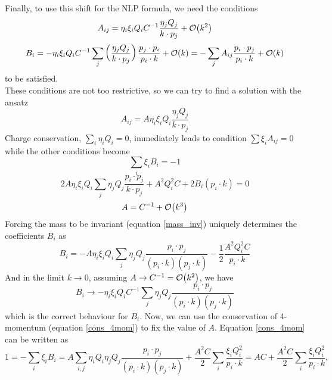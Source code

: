 \documentclass{article}
\begin{document}
Finally, to use this shift for the NLP formula, we need the conditions
\begin{equation*}
A_{ij} = \eta_i\xi_iQ_iC^{-1}\frac{\eta_j Q_j}{k\cdot p_j} + \order{k^2}
\end{equation*}
\begin{equation*}
B_i = -\eta_i\xi_iQ_iC^{-1} \sum_{j} \left(\frac{\eta_j Q_j}{k\cdot p_j}\right)\frac{p_j\cdot p_i }{p_i\cdot k} + \order{k} = - \sum_j A_{ij}\frac{p_i\cdot p_j}{p_i\cdot k} + \order{k}
\end{equation*}
to be satisfied.
\
\\
These conditions are not too restrictive, so we can try to find a solution with the ansatz
\begin{equation*}
A_{ij} = A\eta_i\xi_iQ_i\frac{\eta_j Q_j}{k\cdot p_j}
\end{equation*}
Charge conservation, $\sum_i \eta_i Q_i = 0$, immediately leads to condition $\sum \xi_i A_{ij}=0$ while the other conditions become
\begin{equation}\label{cons_4mom}
\sum_i \xi_i B_i = -1
\end{equation}
\begin{equation}\label{mass_inv}
2A\eta_i\xi_iQ_i\sum_{j}\eta_j Q_j\frac{p_{i}\cdot p_{j}}{k\cdot p_j}+A^2Q^2_iC
+2B_{i}(p_{i}\cdot k)= 0
\end{equation}
\begin{equation*}
A = C^{-1} + \order{k^3}
\end{equation*}
Forcing the mass to be invariant (equation \eqref{mass_inv}) uniquely determines the coefficients $B_i$ as
\begin{equation*}
B_{i}= -A\eta_i\xi_iQ_i\sum_{j}\eta_j Q_j\frac{p_{i}\cdot p_{j}}{(p_{i}\cdot k)(p_j\cdot k)}-\frac{1}{2}\frac{A^2Q^2_iC}{p_i\cdot k}
\end{equation*}
And in the limit $k\to 0$, assuming $A \to C^{-1}=\order{k^2}$, we have
\begin{equation*}
B_{i} \to -\eta_i\xi_iQ_iC^{-1}\sum_{j}\eta_j Q_j\frac{p_{i}\cdot p_{j}}{(p_{i}\cdot k)(p_j\cdot k)}
\end{equation*}
which is the correct behaviour for $B_i$.
Now, we can use the conservation of 4-momentum (equation \eqref{cons_4mom}) to fix the value of $A$. Equation \eqref{cons_4mom} can be written as
\begin{equation*}
1 = -\sum_i \xi_i B_i = A\sum_{i,j} \eta_iQ_i\eta_j Q_j\frac{p_{i}\cdot p_{j}}{(p_{i}\cdot k)(p_j\cdot k)}+\frac{A^2C}{2}\sum_i \frac{\xi_iQ^2_i}{p_i\cdot k} = AC+\frac{A^2C}{2}\sum_i \frac{\xi_iQ^2_i}{p_i\cdot k},
\end{equation*}
\end{document}
